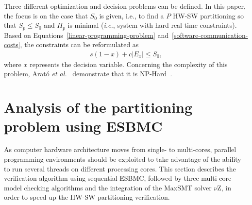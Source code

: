 Three different optimization and decision problems can be defined. In this paper, the focus is on the case that $ S_0 $ is given, i.e., to find a $P$ HW-SW partitioning so that $ S_p \leq S_0 $ and $ H_p $ is minimal ({\it i.e.}, system with hard real-time constraints). Based on Equations~\ref{linear-programming-problem} and~\ref{software-communication-costs}, the constraints can be reformulated as 
%
\begin{align}
\label{hw-sw-partitioning}
s\left(1-x\right) + c|E_x| \leq S_0, 
\end{align}
%
\noindent where $x$ represents the decision variable. Concerning the complexity of this problem, Arat\'o {\it et al.}~\cite{Arato2003} demonstrate that it is NP-Hard~\cite{Cormem}.


\section{Analysis of the partitioning problem using ESBMC}
\label{Analysis-of-the-partitioning-problem-using-ESBMC}

As computer hardware architecture moves from single- to multi-cores, parallel programming environments should be exploited to take advantage of the ability to run several threads on different processing cores. This section describes the verification algorithm using sequential ESBMC, followed by three multi-core model checking algorithms and the integration of the MaxSMT solver $\nu$Z, in order to speed up the HW-SW partitioning verification.

